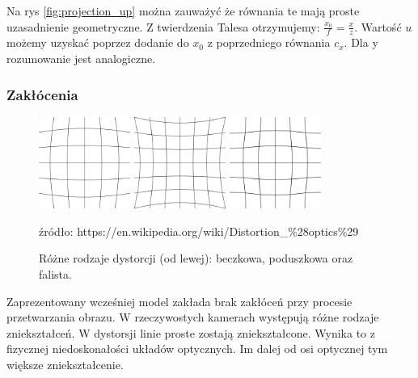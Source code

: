\documentclass[oneside, eng]{mgr}
\begin{document}
Na rys \ref{fig:projection_up} można zauważyć że równania te mają proste uzasadnienie geometryczne. Z twierdzenia Talesa otrzymujemy: 
$\frac{x_0}{f} = \frac{x}{z}$. Wartość $u$ możemy uzyskać poprzez dodanie do $x_0$ z poprzedniego równania $c_x$. Dla y rozumowanie jest analogiczne.


\subsubsection{Zakłócenia}

\begin{figure}
\centering
		\begin{minipage}{3cm}
			\includegraphics[width=3cm]{600px-Barrel_distortion.png}
		\end{minipage}
		\begin{minipage}{3cm}
			\includegraphics[width=3cm]{600px-Pincushion_distortion.png}
		\end{minipage}
		\begin{minipage}{3cm}
			\includegraphics[width=3cm]{600px-Mustache_distortion.png}
		\end{minipage}
	\caption{Różne rodzaje dystorcji (od lewej): beczkowa, poduszkowa oraz falista.}
źródło: https://en.wikipedia.org/wiki/Distortion\_\%28optics\%29
	\label{fig:distortion}
\end{figure}

Zaprezentowany wcześniej model zakłada brak zakłóceń przy procesie przetwarzania obrazu. W rzeczywostych kamerach występują różne rodzaje zniekształceń. W dystorsji linie proste zostają zniekształcone. Wynika to z fizycznej niedoskonałości układów optycznych. Im dalej od osi optycznej tym większe zniekształcenie.
\end{document}
